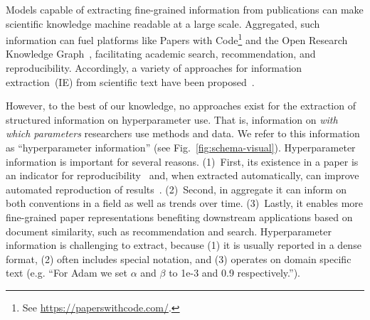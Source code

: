 
Models capable of extracting fine-grained information from publications can make scientific knowledge machine readable at a large scale.
Aggregated, such information can fuel platforms like Papers with Code\footnote{See \url{https://paperswithcode.com/}.} and the Open Research Knowledge Graph~\cite{orkg1,orkg2}, facilitating academic search, recommendation,  and reproducibility.
Accordingly, a variety of approaches for information extraction~(IE) from scientific text have been proposed~\cite{luan2018scierc,Jain2020scirex,semeval21_task8,semeval22_task12,Dunn2022}.  %


However, to the best of our knowledge, no approaches exist for the extraction of structured information on hyperparameter use.
That is, information on \emph{with which parameters} researchers use methods and data. We refer to this information as ``hyperparameter information'' (see Fig.~\ref{fig:schema-visual}).
Hyperparameter information is important for several reasons. (1)~First, its existence in a paper is an indicator for reproducibility~\cite{Radd2019} and, when extracted automatically, can improve automated reproduction of results~\cite{sethi2018}. (2)~Second, in aggregate it can inform on both conventions in a field as well as trends over time. (3)~Lastly, it enables more fine-grained paper representations benefiting downstream applications based on document similarity, such as recommendation and search. %
Hyperparameter information is challenging to extract, because (1) it is usually reported in a dense format, (2) often includes special notation, and (3) operates on domain specific text (e.g. ``For Adam we set $\alpha$ and $\beta$ to 1e-3 and 0.9 respectively.'').

